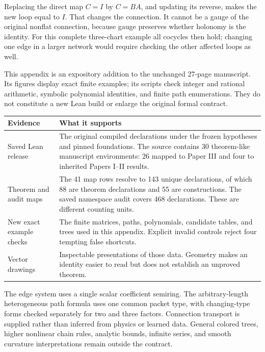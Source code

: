 Replacing the direct map $C=I$ by $C=BA$, and updating its reverse, makes the new loop equal to $I$. That changes the connection. It cannot be a gauge of the original nonflat connection, because gauge preserves whether holonomy is the identity. For this complete three-chart example all cocycles then hold; changing one edge in a larger network would require checking the other affected loops as well.


This appendix is an expository addition to the unchanged 27-page manuscript. Its figures display exact finite examples; its scripts check integer and rational arithmetic, symbolic polynomial identities, and finite path enumerations. They do not constitute a new Lean build or enlarge the original formal contract.

{\small
\begin{tabularx}{\linewidth}{@{}p{.24\linewidth}Y@{}}\toprule
\textbf{Evidence} & \textbf{What it supports}\\\midrule
Saved Lean release & The original compiled declarations under the frozen hypotheses and pinned foundations. The source contains 30 theorem-like manuscript environments: 26 mapped to Paper III and four to inherited Papers I--II results.\\
Theorem and audit maps & The 41 map rows resolve to 143 unique declarations, of which 88 are theorem declarations and 55 are constructions. The saved namespace audit covers 468 declarations. These are different counting units.\\
New exact example checks & The finite matrices, paths, polynomials, candidate tables, and trees used in this appendix. Explicit invalid controls reject four tempting false shortcuts.\\
Vector drawings & Inspectable presentations of those data. Geometry makes an identity easier to read but does not establish an unproved theorem.\\\bottomrule
\end{tabularx}}

The edge system uses a single scalar coefficient semiring. The arbitrary-length heterogeneous path formula uses one common packet type, with changing-type forms checked separately for two and three factors. Connection transport is supplied rather than inferred from physics or learned data. General colored trees, higher nonlinear chain rules, analytic bounds, infinite series, and smooth curvature interpretations remain outside the contract.


